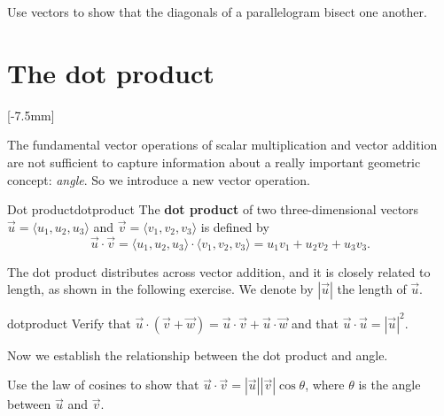 \documentclass[svgnames]{watsonbook}
\begin{document}
\begin{exercise}{}{}
  Use vectors to show that the diagonals of a parallelogram bisect one
  another. 
\end{exercise}

\section{The dot product} \label{sec:dot} 

[-7.5mm]

The fundamental vector operations of scalar multiplication and vector
addition are not sufficient to capture information about a really important
geometric concept: \textit{angle}. So we introduce a new vector
operation.

\begin{defn}{Dot product}{dotproduct}
The \textbf{dot product} of two three-dimensional vectors $\vec{u}
= \langle u_1, u_2, u_3 \rangle$
and $\vec{v} =  \langle v_1, v_2, v_3 \rangle$ is defined by 
\[
\vec{u} \cdot \vec{v} = \langle u_1, u_2, u_3 \rangle \cdot \langle v_1, v_2, v_3 \rangle =
u_1 v_1 + u_2  v_2+ u_3v_3. 
\]
\end{defn}

The dot product distributes across vector addition, and it is closely
related to length, as shown in the following exercise. We denote by
$|\vec{u}|$ the length of $\vec{u}$. 

\begin{exercise}{}{dotproduct}
  Verify that $\vec{u} \cdot (\vec{v} + \vec{w}) = \vec{u} \cdot
  \vec{v} + \vec{u} \cdot \vec{w}$ and that $\vec{u} \cdot
  \vec{u} = |\vec{u}|^2$.
\end{exercise}

Now we establish the relationship between the dot product and angle. 

\begin{example}{}{}
  Use the law of cosines to show that $\vec{u} \cdot \vec{v} =
  |\vec{u}| |\vec{v}| \cos\theta$, where $\theta$ is the angle
  between $\vec{u}$ and $\vec{v}$. 
\end{example}
\end{document}
